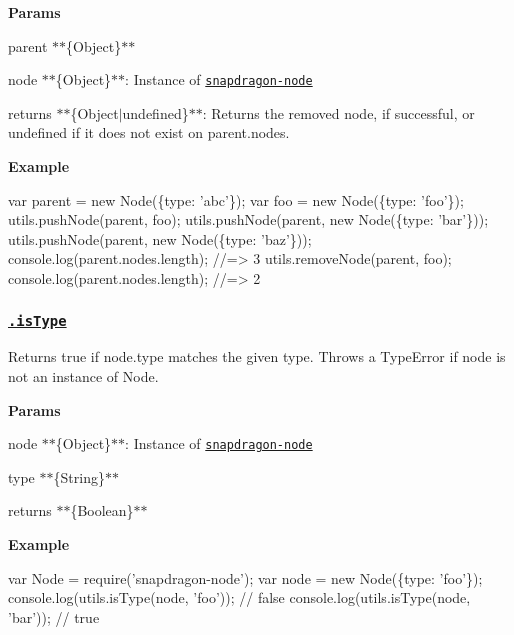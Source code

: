 {\bfseries Params}


\begin{DoxyItemize}
\item {\ttfamily parent} $\ast$$\ast$\{Object\}$\ast$$\ast$
\item {\ttfamily node} $\ast$$\ast$\{Object\}$\ast$$\ast$\+: Instance of \href{https://github.com/jonschlinkert/snapdragon-node}{\tt snapdragon-\/node}
\item {\ttfamily returns} $\ast$$\ast$\{Object$\vert$undefined\}$\ast$$\ast$\+: Returns the removed node, if successful, or undefined if it does not exist on {\ttfamily parent.\+nodes}.
\end{DoxyItemize}

{\bfseries Example}


\begin{DoxyCode}
var parent = new Node(\{type: 'abc'\});
var foo = new Node(\{type: 'foo'\});
utils.pushNode(parent, foo);
utils.pushNode(parent, new Node(\{type: 'bar'\}));
utils.pushNode(parent, new Node(\{type: 'baz'\}));
console.log(parent.nodes.length); //=> 3
utils.removeNode(parent, foo);
console.log(parent.nodes.length); //=> 2
\end{DoxyCode}


\subsubsection*{\href{index.js#L443}{\tt .is\+Type}}

Returns true if {\ttfamily node.\+type} matches the given {\ttfamily type}. Throws a {\ttfamily Type\+Error} if {\ttfamily node} is not an instance of {\ttfamily Node}.

{\bfseries Params}


\begin{DoxyItemize}
\item {\ttfamily node} $\ast$$\ast$\{Object\}$\ast$$\ast$\+: Instance of \href{https://github.com/jonschlinkert/snapdragon-node}{\tt snapdragon-\/node}
\item {\ttfamily type} $\ast$$\ast$\{String\}$\ast$$\ast$
\item {\ttfamily returns} $\ast$$\ast$\{Boolean\}$\ast$$\ast$
\end{DoxyItemize}

{\bfseries Example}


\begin{DoxyCode}
var Node = require('snapdragon-node');
var node = new Node(\{type: 'foo'\});
console.log(utils.isType(node, 'foo')); // false
console.log(utils.isType(node, 'bar')); // true
\end{DoxyCode}


